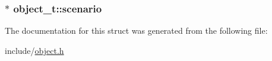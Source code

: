\subsubsection[{\texorpdfstring{scenario}{scenario}}]{$\ast$ object\+\_\+t\+::scenario}\hypertarget{structobject__t_aa3f8f0db477d6396b00d03b204c07329}{}\label{structobject__t_aa3f8f0db477d6396b00d03b204c07329}


The documentation for this struct was generated from the following file\+:\begin{DoxyCompactItemize}
\item 
include/\hyperlink{object_8h}{object.\+h}\end{DoxyCompactItemize}
